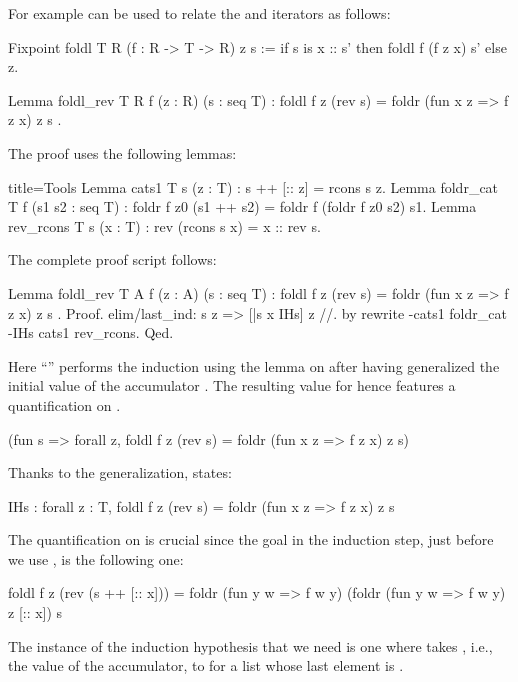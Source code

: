 For example  can be used to relate the
 and  iterators as follows:

\begin{coq}{}{}
Fixpoint foldl T R (f : R -> T -> R) z s :=
  if s is x :: s' then foldl f (f z x) s' else z.

Lemma foldl_rev T R f (z : R) (s : seq T) :
  foldl f z (rev s) = foldr (fun x z => f z x) z s .
\end{coq}

The proof uses the following lemmas:

\begin{coq}{}{title=Tools}
Lemma cats1 T s (z : T) : s ++ [:: z] = rcons s z.
Lemma foldr_cat T f (s1 s2 : seq T) :
  foldr f z0 (s1 ++ s2) = foldr f (foldr f z0 s2) s1.
Lemma rev_rcons T s (x : T) : rev (rcons s x) = x :: rev s.
\end{coq}

The complete proof script follows:

\begin{coq}{}{}
Lemma foldl_rev T A f (z : A) (s : seq T) :
  foldl f z (rev s) = foldr (fun x z => f z x) z s .
Proof.
elim/last_ind: s z => [|s x IHs] z //.
by rewrite -cats1 foldr_cat -IHs cats1 rev_rcons.
Qed.
\end{coq}

Here ``'' performs the induction using the
 lemma on  after having generalized the initial value of
the accumulator .  The resulting value for  hence
features a quantification on .

\begin{coq}{}{}
(fun s => forall z, foldl f z (rev s) = foldr (fun x z => f z x) z s)
\end{coq}

Thanks to the generalization,  states:

\begin{coq}{}{}
IHs : forall z : T, foldl f z (rev s) = foldr (fun x z => f z x) z s
\end{coq}
The quantification on  is crucial since the goal in the induction step,
just before we use , is the following one:

\begin{coqout}{}{}
foldl f z (rev (s ++ [:: x])) =
  foldr (fun y w => f w y) (foldr (fun y w => f w y) z [:: x]) s
\end{coqout}

The instance of the induction hypothesis that we need is
one where  takes ,
i.e., the value of the accumulator, to  for a list
whose last element is .

